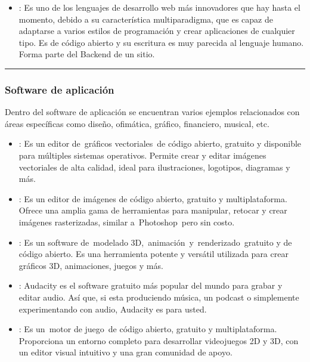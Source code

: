 \documentclass[letterpaper,10pt,spanish]{sphinxmanual}
\begin{document}
\begin{itemize}
\item {} 
\sphinxAtStartPar
{}: Es uno de los lenguajes de desarrollo web más innovadores que hay hasta el momento, debido a su característica multiparadigma, que es capaz de adaptarse a varios estilos de programación y crear aplicaciones de cualquier tipo. Es de código abierto y su escritura es muy parecida al lenguaje humano. Forma parte del Back\sphinxhyphen{}end de un sitio.

\end{itemize}


\bigskip\hrule\bigskip



\subsubsection{Software de aplicación}
\label{\detokenize{1_guias/10programacion/G1021:software-de-aplicacion}}
\sphinxAtStartPar
Dentro del software de aplicación se encuentran varios ejemplos relacionados con áreas específicas como diseño, ofimática, gráfico, financiero, musical, etc.
\begin{itemize}
\item {} 
\sphinxAtStartPar
{}: Es un editor de gráficos vectoriales de código abierto, gratuito y disponible para múltiples sistemas operativos. Permite crear y editar imágenes vectoriales de alta calidad, ideal para ilustraciones, logotipos, diagramas y más.

\item {} 
\sphinxAtStartPar
{}: Es un editor de imágenes de código abierto, gratuito y multiplataforma. Ofrece una amplia gama de herramientas para manipular, retocar y crear imágenes rasterizadas, similar a Photoshop pero sin costo.

\item {} 
\sphinxAtStartPar
{}: Es un software de modelado 3D, animación y renderizado gratuito y de código abierto. Es una herramienta potente y versátil utilizada para crear gráficos 3D, animaciones, juegos y más.

\item {} 
\sphinxAtStartPar
{}: Audacity es el software gratuito más popular del mundo para grabar y editar audio. Así que, si esta produciendo música, un podcast o simplemente experimentando con audio, Audacity es para usted.

\item {} 
\sphinxAtStartPar
{}: Es un motor de juego de código abierto, gratuito y multiplataforma. Proporciona un entorno completo para desarrollar videojuegos 2D y 3D, con un editor visual intuitivo y una gran comunidad de apoyo.

\end{itemize}
\end{document}
